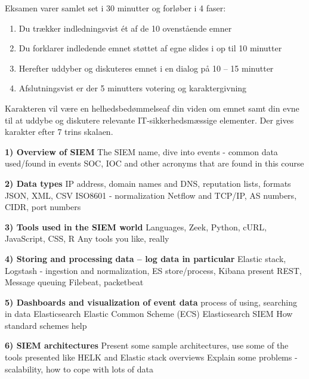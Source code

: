 \documentclass[Screen16to9,17pt]{foils}
\begin{document}

Eksamen varer samlet set i 30 minutter og forløber i 4 faser:

\begin{enumerate}
  \item Du trækker indledningsvist ét af de 10 ovenstående emner
  \item Du forklarer indledende emnet støttet af egne slides i op til 10 minutter
  \item Herefter uddyber og diskuteres emnet i en dialog på 10 -- 15 minutter
  \item Afslutningsvist er der 5 minutters votering og karaktergivning
\end{enumerate}

Karakteren vil være en helhedsbedømmelseaf din viden om emnet samt din evne til at uddybe og diskutere relevante IT-sikkerhedsmæssige elementer. Der gives karakter efter 7 trins skalaen.



\begin{list2}
\item {\bf 1) Overview of SIEM}
The SIEM name, dive into events - common data used/found in events SOC, IOC and other acronyms that are found in this course

\item {\bf 2) Data types}
IP address, domain names and DNS, reputation lists, formats JSON, XML, CSV ISO8601 - normalization Netflow and TCP/IP, AS numbers, CIDR, port numbers

\item {\bf 3) Tools used in the SIEM world}
Languages, Zeek, Python, cURL, JavaScript, CSS, R Any tools you like, really

\item {\bf 4) Storing and processing data -- log data in particular}
Elastic stack, Logstash - ingestion and normalization, ES store/process, Kibana present REST, Message queuing Filebeat, packetbeat

\item {\bf 5) Dashboards and visualization of event data}
process of using, searching in data Elasticsearch Elastic Common Scheme (ECS) Elasticsearch SIEM How standard schemes help

\item {\bf 6) SIEM architectures}
Present some sample architectures, use some of the tools presented like HELK and Elastic stack overviews
Explain some problems - scalability, how to cope with lots of data
\end{list2}
\end{document}
